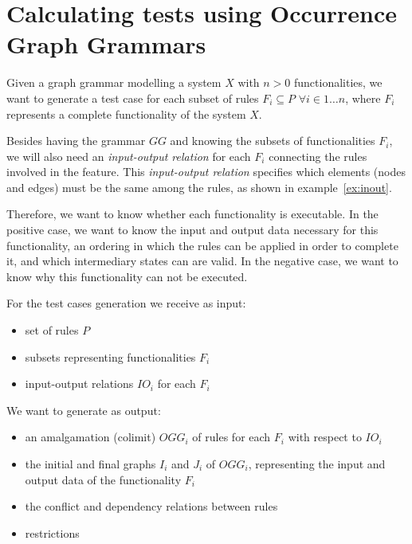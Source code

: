\section{Calculating tests using Occurrence Graph Grammars}

Given a graph grammar \graphGrammar{} modelling a system $X$ with $n > 0$ functionalities, we want to generate a test case for each subset of rules $F_i \subseteq P$ $\forall i \in 1\ldots n$, where $F_i$ represents a complete functionality  of the system $X$.

Besides having the grammar $GG$ and knowing the subsets of functionalities $F_i$, we will also need an \emph{input-output relation} for each $F_i$ connecting the rules involved in the feature. This \emph{input-output relation} specifies which elements (nodes and edges) must be the same among the rules, as shown in example~\ref{ex:inout}.

Therefore, we want to know whether each functionality is executable. In the positive case, we want to know the input and output data necessary for this functionality, an ordering in which the rules can be applied in order to complete it, and which intermediary states can are valid. In the negative case, we want to know why this functionality can not be executed.

\begin{example}\label{ex:inout}
\end{example}

For the test cases generation we receive as input:

\begin{itemize}
\item set of rules $P$
\item subsets representing functionalities $F_i$
\item input-output relations $IO_i$ for each $F_i$
\end{itemize}

We want to generate as output:

\begin{itemize}
\item an amalgamation (colimit) $OGG_i$ of rules for each $F_i$ with respect to $IO_i$
\item the initial and final graphs $I_i$ and $J_i$ of $OGG_i$, representing the input and output data of the functionality $F_i$
\item the conflict and dependency relations between rules 
\item restrictions 
\end{itemize}

